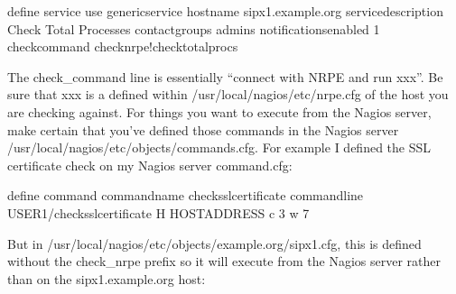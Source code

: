\documentclass[letterpaper,10pt,english]{sphinxmanual}
\begin{document}
\begin{sphinxVerbatim}[commandchars=\\\{\}]
define service\PYGZob{}
        use                             generic\PYGZhy{}service
        host\PYGZus{}name                       sipx1.example.org
        service\PYGZus{}description             Check Total Processes
        contact\PYGZus{}groups                  admins
        notifications\PYGZus{}enabled           1
        check\PYGZus{}command                   check\PYGZus{}nrpe!check\PYGZus{}total\PYGZus{}procs
        \PYGZcb{}
\end{sphinxVerbatim}

The check\_command line is essentially “connect with NRPE and run xxx”. Be sure that xxx is a defined within /usr/local/nagios/etc/nrpe.cfg of the host you are checking against. For things you want to execute from the Nagios server, make certain that you’ve defined those commands in the Nagios server /usr/local/nagios/etc/objects/commands.cfg. For example I defined the SSL certificate check on my Nagios server command.cfg:

\begin{sphinxVerbatim}[commandchars=\\\{\}]
define command \PYGZob{}
        command\PYGZus{}name    check\PYGZus{}ssl\PYGZus{}certificate
        command\PYGZus{}line    \PYGZdl{}USER1\PYGZdl{}/check\PYGZus{}ssl\PYGZus{}certificate \PYGZhy{}H \PYGZdl{}HOSTADDRESS\PYGZdl{} \PYGZhy{}c 3 \PYGZhy{}w 7
       \PYGZcb{}
\end{sphinxVerbatim}

But in /usr/local/nagios/etc/objects/example.org/sipx1.cfg, this is defined without the check\_nrpe prefix so it will execute from the Nagios server rather than on the sipx1.example.org host:

\begin{sphinxVerbatim}[commandchars=\\\{\}]
 
                                     
                               
                       
                          
                   
                           
\end{sphinxVerbatim}
\end{document}
